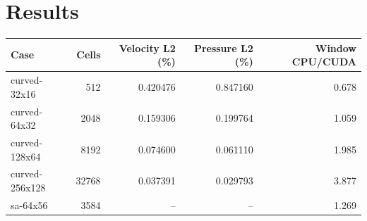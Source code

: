 \documentclass[11pt]{article}
\begin{document}
\section{Results}
\begin{tabular}{lrrrr}\toprule Case & Cells & Velocity L2 (\%) & Pressure L2 (\%) & Window CPU/CUDA\\\midrule
curved-32x16 & 512 & 0.420476 & 0.847160 & 0.678 \\
curved-64x32 & 2048 & 0.159306 & 0.199764 & 1.059 \\
curved-128x64 & 8192 & 0.074600 & 0.061110 & 1.985 \\
curved-256x128 & 32768 & 0.037391 & 0.029793 & 3.877 \\
sa-64x56 & 3584 & -- & -- & 1.269 \\
\bottomrule\end{tabular}
\end{document}
